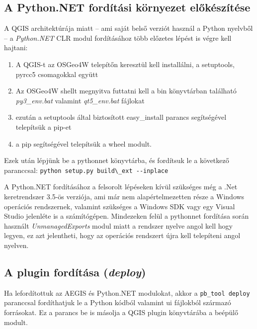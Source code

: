 \subsection{A Python.NET fordítási környezet előkészítése}
A QGIS architektúrája miatt -- ami saját belső verziót használ a Python nyelvből -- a \emph{Python.NET} CLR modul fordításához több előzetes lépést is végre kell hajtani:
\begin{enumerate}
	\item A QGIS-t az OSGeo4W telepítőn keresztül kell installálni, a setuptools, pyrcc5 csomagokkal együtt
	\item Az OSGeo4W shellt megnyitva futtatni kell a bin könyvtárban található \emph{py3\_env.bat} valamint \emph{qt5\_env.bat} fájlokat
	\item ezután a setuptools által biztosított easy\_install parancs segítségével telepítsük a pip-et
	\item a pip segítségével telepítsük a wheel modult.
\end{enumerate}
Ezek után lépjünk be a pythonnet könyvtárba, és fordítsuk le a következő paranccsal: \verb|python setup.py build\_ext --inplace|
\begin{note}
A Python.NET fordításához a felsorolt lépéseken kívül szükséges még a .Net keretrendszer 3.5-ös verziója, ami már nem alapértelmezetten része a Windows operációs rendszernek, valamint szükséges a Windows SDK vagy egy Visual Studio jelenléte is a számítógépen. Mindezeken felül a pythonnet fordítása során használt \emph{UnmanagedExports} modul miatt a rendszer nyelve angol kell hogy legyen, ez azt jelentheti, hogy az operációs rendszert újra kell telepíteni angol nyelven.
\end{note}
\subsection{A plugin fordítása (\emph{deploy})}
Ha lefordítottuk az AEGIS és Python.NET modulokat, akkor a \texttt{pb\_tool deploy} paranccsal fordíthatjuk le a Python kódból valamint ui fájlokból származó forrásokat. Ez a parancs be is másolja a QGIS plugin könyvtárába a beépülő modult.

